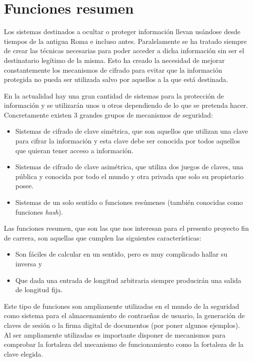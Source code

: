 \chapter{Funciones resumen}

Los sistemas destinados a ocultar o proteger información llevan usándose desde tiempos de la antigua Roma \cite{Luciano87cryptology:from} e incluso antes. Paralelamente se ha tratado siempre de crear las técnicas necesarias para poder acceder a dicha información sin ser el destinatario legítimo de la misma. Esto ha creado la necesidad de mejorar constantemente los mecanismos de cifrado para evitar que la información protegida no pueda ser utilizada salvo por aquellos a la que está destinada.

En la actualidad hay una gran cantidad de sistemas para la protección de información y se utilizarán unos u otros dependiendo de lo que se pretenda hacer. Concretamente existen 3 grandes grupos de mecanismos de seguridad:
\begin{itemize}
	\item Sistemas de cifrado de clave simétrica, que son aquellos que utilizan una clave para cifrar la información y esta clave debe ser conocida por todos aquellos que quieran tener acceso a información.
	\item Sistemas de cifrado de clave asimétrica, que utiliza dos juegos de claves, una pública y conocida por todo el mundo y otra privada que solo su propietario posee.
	\item Sistemas de un solo sentido o funciones resúmenes (también conocidas como funciones \emph{hash}).
\end{itemize}

Las funciones resumen, que son las que nos interesan para el presento proyecto fin de carrera, son aquellas que cumplen las siguientes características:

\begin{itemize}
	\item Son fáciles de calcular en un sentido, pero es muy complicado hallar su inversa y
	\item Que dada una entrada de longitud arbitraria siempre producirán una salida de longitud fija.
\end{itemize}

Este tipo de funciones son ampliamente utilizadas en el mundo de la seguridad como sistema para el almacenamiento de contraeñas de usuario, la generación de claves de sesión o la firma digital de documentos (por poner algunos ejemplos). Al ser ampliamente utilizadas es importante disponer de mecanismos para comprobar la fortaleza del mecanismo de funcionamiento como la fortaleza de la clave elegida.

